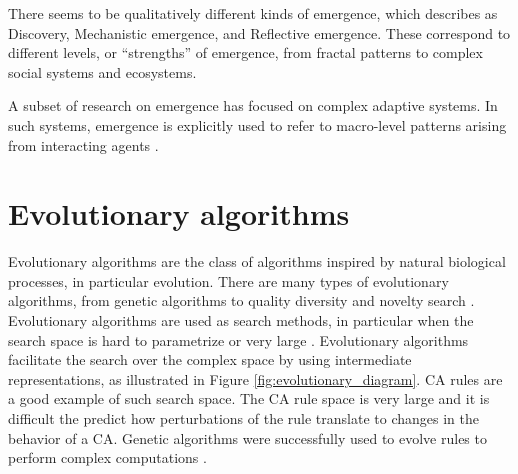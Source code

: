 There seems to be qualitatively different kinds of emergence, which
\textcite{dehaanHowEmergenceArises2006} describes as Discovery, Mechanistic
emergence, and Reflective emergence. These correspond to different levels, or
``strengths'' of emergence, from fractal patterns to complex social systems and
ecosystems.

A subset of research on emergence has focused on complex adaptive systems. In
such systems, emergence is explicitly used to refer to macro-level patterns
arising from interacting agents \parencite{hollandEmergenceChaosOrder2000,
  kauffmanHomeUniverseSearch1995, langtonStudyingArtificialLife1986}.


\section{Evolutionary algorithms}\label{sec:evol-algor}
Evolutionary algorithms are the class of algorithms inspired by natural
biological processes, in particular evolution. There are many types of
evolutionary algorithms, from genetic algorithms to quality diversity and
novelty search \parencite{lehmanAbandoningObjectivesEvolution2011,
  lehmanEvolvingDiversityVirtual2011}. Evolutionary algorithms are used as
search methods, in particular when the search space is hard to parametrize or
very large \parencite{poliRelationsSearchEvolutionary1996}. Evolutionary
algorithms facilitate the search over the complex space by using intermediate
representations, as illustrated in Figure \ref{fig:evolutionary_diagram}.
\ac{CA} rules are a good example of such search space. The \ac{CA} rule space is
very large and it is difficult the predict how perturbations of the rule
translate to changes in the behavior of a \ac{CA}. Genetic algorithms were
successfully used to evolve rules to perform complex computations
\parencite{mitchellEvolvingCellularAutomata1996}.

